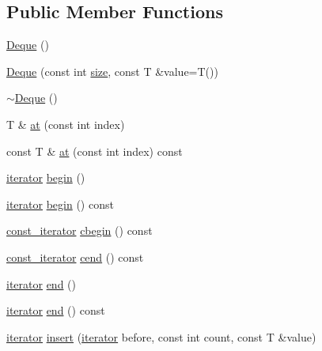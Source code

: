 \subsection*{Public Member Functions}
\begin{DoxyCompactItemize}
\item 
\hyperlink{classprism_1_1containers_1_1_deque_ad634e7301c147a716a486765452bab92}{Deque} ()
\item 
\hyperlink{classprism_1_1containers_1_1_deque_a7fd0a5840ffddf09083a61b7220cbe22}{Deque} (const int \hyperlink{classprism_1_1containers_1_1_deque_a4a2d2f35b50d44fc393f3f08ea3ff1df}{size}, const T \&value=T())
\item 
\hyperlink{classprism_1_1containers_1_1_deque_a976bc3256dcc9baf18343387e5f395c1}{$\sim$\+Deque} ()
\item 
T \& \hyperlink{classprism_1_1containers_1_1_deque_a1a1074beeda9e94e760731953c4e7875}{at} (const int index)
\item 
const T \& \hyperlink{classprism_1_1containers_1_1_deque_a3f85e662477c829424f6f2d0a9aa7b1a}{at} (const int index) const 
\item 
\hyperlink{classprism_1_1containers_1_1_deque_a684be9c82e48df43905b70432bbc1e68}{iterator} \hyperlink{classprism_1_1containers_1_1_deque_ae6d9429bfd3446c021b285c34193035b}{begin} ()
\item 
\hyperlink{classprism_1_1containers_1_1_deque_a684be9c82e48df43905b70432bbc1e68}{iterator} \hyperlink{classprism_1_1containers_1_1_deque_a580ce1c829d58b32dd7bbdfc1e5b1b1d}{begin} () const 
\item 
\hyperlink{classprism_1_1containers_1_1_deque_acd441aa1f776dfe56929dfb0449ba73f}{const\+\_\+iterator} \hyperlink{classprism_1_1containers_1_1_deque_a7006170ab7ca105aeb447acf5134d92b}{cbegin} () const 
\item 
\hyperlink{classprism_1_1containers_1_1_deque_acd441aa1f776dfe56929dfb0449ba73f}{const\+\_\+iterator} \hyperlink{classprism_1_1containers_1_1_deque_ab06aa01b7666833e0ce5f4e33d6b19e3}{cend} () const 
\item 
\hyperlink{classprism_1_1containers_1_1_deque_a684be9c82e48df43905b70432bbc1e68}{iterator} \hyperlink{classprism_1_1containers_1_1_deque_a723c0beaf6d0128c4a78ee8789aeaee1}{end} ()
\item 
\hyperlink{classprism_1_1containers_1_1_deque_a684be9c82e48df43905b70432bbc1e68}{iterator} \hyperlink{classprism_1_1containers_1_1_deque_a9c6b512184d6fa64c438739c086b2128}{end} () const 
\item 
\hyperlink{classprism_1_1containers_1_1_deque_a684be9c82e48df43905b70432bbc1e68}{iterator} \hyperlink{classprism_1_1containers_1_1_deque_ad7e9d8778c550a93e05d6c3338e48b4b}{insert} (\hyperlink{classprism_1_1containers_1_1_deque_a684be9c82e48df43905b70432bbc1e68}{iterator} before, const int count, const T \&value)

\end{DoxyCompactItemize}
